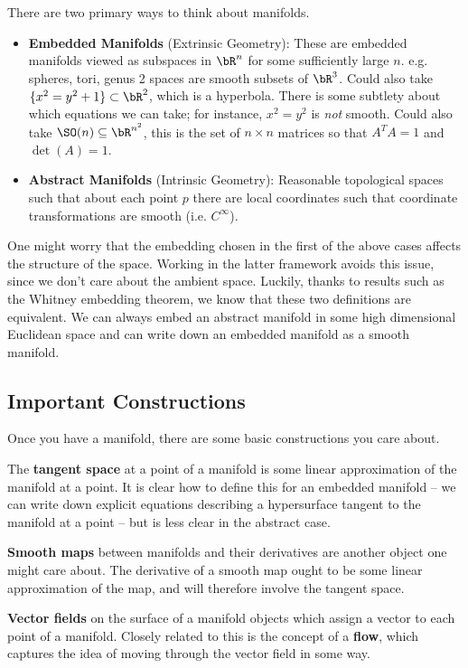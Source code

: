 \noindent There are two primary ways to think about manifolds.
\begin{itemize}
	\item \textbf{Embedded Manifolds} (Extrinsic Geometry): These are embedded manifolds viewed as subspaces in $\bR^n$ for some sufficiently large $n$. e.g. spheres, tori, genus 2 spaces are smooth subsets of $\bR^3$. Could also take $\{x^2 = y^2 + 1\} \subset \bR^2$, which is a hyperbola. There is some subtlety about which equations we can take; for instance, $x^2 = y^2$ is \emph{not} smooth. Could also take $\SO(n) \subseteq \bR^{n^2}$, this is the set of $n \times n$ matrices so that $A^TA = 1$ and $\det(A) = 1$.

	\item \textbf{Abstract Manifolds} (Intrinsic Geometry): Reasonable topological spaces such that about each point $p$ there are local coordinates such that coordinate transformations are smooth (i.e. $C^\infty$).
\end{itemize}
One might worry that the embedding chosen in the first of the above cases affects the structure of the space. Working in the latter framework avoids this issue, since we don't care about the ambient space. Luckily, thanks to results such as the Whitney embedding theorem, we know that these two definitions are equivalent. We can always embed an abstract manifold in some high dimensional Euclidean space and can write down an embedded manifold as a smooth manifold.

\bigskip

\subsection{Important Constructions}
Once you have a manifold, there are some basic constructions you care about.

The \textbf{tangent space} at a point of a manifold is some linear approximation of the manifold at a point. It is clear how to define this for an embedded manifold -- we can write down explicit equations describing a hypersurface tangent to the manifold at a point -- but is less clear in the abstract case.

\textbf{Smooth maps} between manifolds and their derivatives are another object one might care about. The derivative of a smooth map ought to be some linear approximation of the map, and will therefore involve the tangent space.

\textbf{Vector fields} on the surface of a manifold objects which assign a vector to each point of a manifold. Closely related to this is the concept of a \textbf{flow}, which captures the idea of moving through the vector field in some way.

